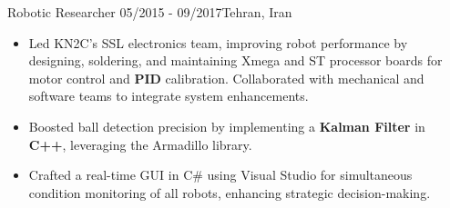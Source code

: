 \resumeSubheadingReza
{Robotic Researcher}{}
{05/2015 - 09/2017}{Tehran, Iran}
{
    \vspace{-12pt}
    \begin{itemize}
        \item{Led KN2C's SSL electronics team, improving robot performance by designing, soldering, and maintaining Xmega and ST processor boards for motor control and \textbf{PID} calibration. Collaborated with mechanical and software teams to integrate system enhancements.}
        
        \item{Boosted ball detection precision by implementing a \textbf{Kalman Filter} in \textbf{C++}, leveraging the Armadillo library.}
        \item{Crafted a real-time GUI in C\# using Visual Studio for simultaneous condition monitoring of all robots, enhancing strategic decision-making.}
    \end{itemize}
}


